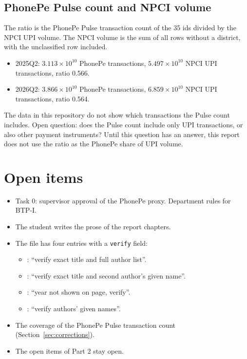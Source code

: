 \documentclass[11pt,a4paper]{article}
\begin{document}
\subsection{PhonePe Pulse count and NPCI volume}
The ratio is the PhonePe Pulse transaction count of the 35 ids divided by the NPCI UPI volume. The NPCI volume is the sum of all rows without a district, with the unclassified row included.
\begin{itemize}
\item 2025Q2: $3.113\times10^{10}$ PhonePe transactions, $5.497\times10^{10}$ NPCI UPI transactions, ratio 0.566.
\item 2026Q2: $3.866\times10^{10}$ PhonePe transactions, $6.859\times10^{10}$ NPCI UPI transactions, ratio 0.564.
\end{itemize}
The data in this repository do not show which transactions the Pulse count includes. Open question: does the Pulse count include only UPI transactions, or also other payment instruments? Until this question has an answer, this report does not use the ratio as the PhonePe share of UPI volume.

\section{Open items}
\begin{itemize}
\item Task 0: supervisor approval of the PhonePe proxy. Department rules for BTP-I.
\item The student writes the prose of the report chapters.
\item The file  has four entries with a \texttt{verify} field:
\begin{itemize}
\item {}: ``verify exact title and full author list''.
\item {}: ``verify exact title and second author's given name''.
\item {}: ``year not shown on page, verify''.
\item {}: ``verify authors' given names''.
\end{itemize}
\item The coverage of the PhonePe Pulse transaction count (Section~\ref{sec:corrections}).
\item The open items of Part 2 stay open.
\end{itemize}
\end{document}
